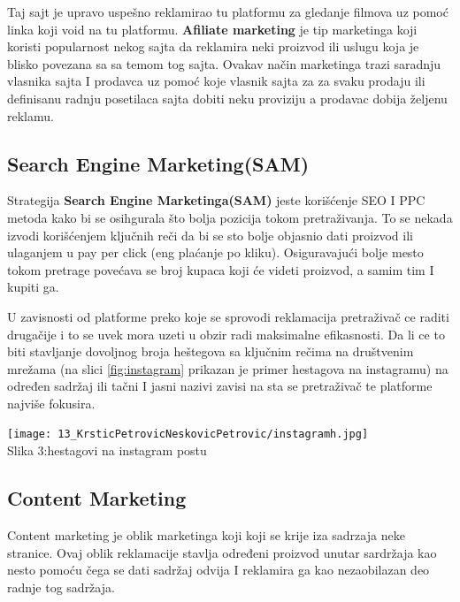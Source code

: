 \documentclass[a4paper]{article}
\begin{document}
{Taj sajt je upravo uspešno reklamirao tu platformu za gledanje filmova uz pomoć linka koji void na tu platformu. \textbf{Afiliate marketing} je tip marketinga koji koristi popularnost nekog sajta da reklamira neki proizvod ili uslugu koja je blisko povezana sa sa temom tog sajta. 
Ovakav način marketinga trazi saradnju vlasnika sajta I prodavca uz pomoć koje vlasnik sajta za za svaku prodaju ili definisanu radnju posetilaca sajta dobiti neku proviziju a prodavac dobija željenu reklamu.







\subsection{Search Engine Marketing(SAM)  }
\label{subsec:SAM}
Strategija \textbf{Search Engine Marketinga(SAM)} jeste korišćenje SEO I PPC metoda kako bi se osihgurala što bolja pozicija tokom pretraživanja. To se nekada izvodi korišćenjem ključnih reči da bi se sto bolje objasnio dati proizvod ili ulaganjem u pay per click (eng plaćanje po kliku). Osiguravajući bolje mesto tokom pretrage povećava se broj kupaca koji će videti proizvod, a samim tim I kupiti ga.

 U zavisnosti od platforme preko koje se sprovodi reklamacija pretraživač ce raditi drugačije i to se uvek mora uzeti u obzir radi maksimalne efikasnosti. Da li ce to biti stavljanje dovoljnog broja heštegova sa ključnim rečima na društvenim mrežama (na slici \ref{fig:instagram}
 prikazan je primer hestagova na instagramu) na određen sadržaj ili tačni I jasni nazivi zavisi na sta se pretraživač te platforme najviše fokusira.


\begin{center}
    \texttt{[image: 13\_KrsticPetrovicNeskovicPetrovic/instagramh.jpg]}\\
    \large{Slika 3:hestagovi na instagram postu}
\end{center}
\label{fig:instagram}

\subsection{Content Marketing  }
\label{subsec:Content}
Content marketing je oblik marketinga koji koji se krije iza sadrzaja neke stranice. Ovaj oblik reklamacije stavlja određeni proizvod unutar sardržaja kao nesto pomoću čega se dati sadržaj odvija I reklamira ga kao nezaobilazan deo radnje tog sadržaja. 

}
\end{document}
